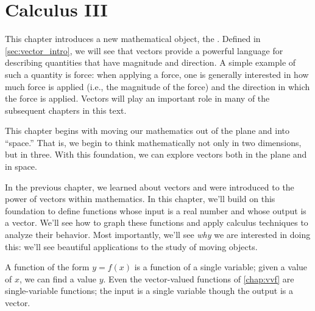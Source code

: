 \part*{Calculus III}



This chapter introduces a new mathematical object, the . Defined in \autoref{sec:vector_intro}, we will see that vectors provide a powerful language for describing quantities that have magnitude and direction. A simple example of such a quantity is force: when applying a force, one is generally interested in how much force is applied (i.e., the magnitude of the force) and the direction in which the force is applied. Vectors will play an important role in many of the subsequent chapters in this text. 

This chapter begins with moving our mathematics out of the plane and into ``space.'' That is, we begin to think mathematically not only in two dimensions, but in three. With this foundation, we can explore vectors both in the plane and in space. 







%



In the previous chapter, we learned about vectors and were introduced to the power of vectors within mathematics. In this chapter, we'll build on this foundation to define functions whose input is a real number and whose output is a vector. We'll see how to graph these functions and apply calculus techniques to analyze their behavior. Most importantly, we'll see \textit{why} we are interested in doing this: we'll see beautiful applications to the study of moving objects.









A function of the form $y=f(x)$ is a function of a single variable; given a value of $x$, we can find a value $y$. Even the vector-valued functions of \autoref{chap:vvf} are single-variable functions; the input is a single variable though the output is a vector.

